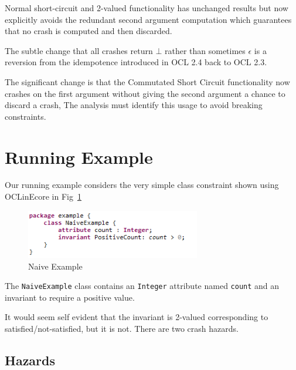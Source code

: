 \documentclass{llncs}
\begin{document}
Normal short-circuit and 2-valued functionality has unchanged results but now explicitly avoids the redundant second argument computation which guarantees that no crash is computed and then discarded.


The subtle change that all crashes return $\bot$ rather than sometimes $\epsilon$ is a reversion from the idempotence introduced in OCL 2.4 back to OCL 2.3.

The significant change is that the Commutated Short Circuit functionality now crashes on the first argument without giving the second argument a chance to discard a crash, The analysis must identify this usage to avoid breaking constraints.
 
\section{Running Example}\label{Running Example}

Our running example considers the very simple class constraint shown using OCLinEcore\cite{OCLinEcore} in Fig~\ref{fig:NaiveExample}

\begin{figure}
	\vspace{-10pt}
	\begin{center}
		\includegraphics[width=3.0in]{NaiveExample.png}
	\end{center}
	\vspace{-10pt}
	\caption{Naive Example}
	\label{fig:NaiveExample}
	\vspace{-10pt}
\end{figure}

The \verb|NaiveExample| class contains an \verb|Integer| attribute named \verb|count| and an invariant to require a positive value.

It would seem self evident that the invariant is 2-valued corresponding to satisfied/not-satisfied, but it is not. There are two crash hazards.

\subsection{Hazards}
\end{document}
